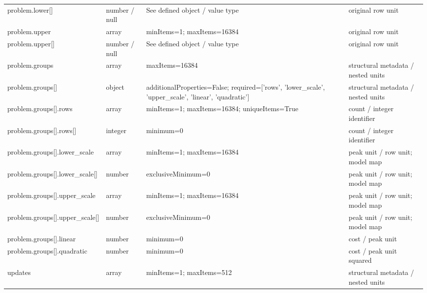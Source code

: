 \begin{longtable}{@{}>{\raggedright\arraybackslash}p{}>{\raggedright\arraybackslash}p{}>{\raggedright\arraybackslash}p{}>{\raggedright\arraybackslash}p{}@{}}
problem.\allowbreak{}lower[] & number /\allowbreak{} null & See defined object /\allowbreak{} value type & original row unit\\
problem.\allowbreak{}upper & array & minItems=\allowbreak{}1; maxItems=\allowbreak{}16384 & original row unit\\
problem.\allowbreak{}upper[] & number /\allowbreak{} null & See defined object /\allowbreak{} value type & original row unit\\
problem.\allowbreak{}groups & array & maxItems=\allowbreak{}16384 & structural metadata /\allowbreak{} nested units\\
problem.\allowbreak{}groups[] & object & additionalProperties=\allowbreak{}False; required=\allowbreak{}['rows', 'lower\_\allowbreak{}scale', 'upper\_\allowbreak{}scale', 'linear', 'quadratic'] & structural metadata /\allowbreak{} nested units\\
problem.\allowbreak{}groups[].\allowbreak{}rows & array & minItems=\allowbreak{}1; maxItems=\allowbreak{}16384; uniqueItems=\allowbreak{}True & count /\allowbreak{} integer identifier\\
problem.\allowbreak{}groups[].\allowbreak{}rows[] & integer & minimum=\allowbreak{}0 & count /\allowbreak{} integer identifier\\
problem.\allowbreak{}groups[].\allowbreak{}lower\_\allowbreak{}scale & array & minItems=\allowbreak{}1; maxItems=\allowbreak{}16384 & peak unit /\allowbreak{} row unit; model map\\
problem.\allowbreak{}groups[].\allowbreak{}lower\_\allowbreak{}scale[] & number & exclusiveMinimum=\allowbreak{}0 & peak unit /\allowbreak{} row unit; model map\\
problem.\allowbreak{}groups[].\allowbreak{}upper\_\allowbreak{}scale & array & minItems=\allowbreak{}1; maxItems=\allowbreak{}16384 & peak unit /\allowbreak{} row unit; model map\\
problem.\allowbreak{}groups[].\allowbreak{}upper\_\allowbreak{}scale[] & number & exclusiveMinimum=\allowbreak{}0 & peak unit /\allowbreak{} row unit; model map\\
problem.\allowbreak{}groups[].\allowbreak{}linear & number & minimum=\allowbreak{}0 & cost /\allowbreak{} peak unit\\
problem.\allowbreak{}groups[].\allowbreak{}quadratic & number & minimum=\allowbreak{}0 & cost /\allowbreak{} peak unit squared\\
updates & array & minItems=\allowbreak{}1; maxItems=\allowbreak{}512 & structural metadata /\allowbreak{} nested units\\

\end{longtable}
